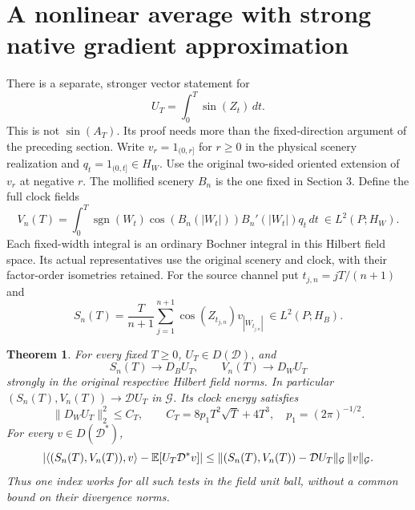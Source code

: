 \documentclass[11pt]{article}
\newtheorem{theorem}{Theorem}[section]
\newcommand{\D}{\mathcal D}\newcommand{\G}{\mathcal G}
\begin{document}
\section{A nonlinear average with strong native gradient approximation}
There is a separate, stronger vector statement for
\[
 U_T=\int_0^T\sin(Z_t)\,dt.
\]
This is not $\sin(A_T)$. Its proof needs more than the fixed-direction
argument of the preceding section. Write $v_r=1_{(0,r]}$ for $r\geq0$
in the physical scenery realization and $q_t=1_{(0,t]}\in H_W$.
Use the original two-sided oriented extension of $v_r$ at negative
$r$. The mollified scenery $B_n$ is the one fixed in Section 3.
Define the full clock fields
\begin{equation}\label{eq:sine-native-clock}
 V_n(T)=\int_0^T\operatorname{sgn}(W_t)
       \cos(B_n(|W_t|))B_n'(|W_t|)q_t\,dt
       \ \in L^2(P;H_W).
\end{equation}
Each fixed-width integral is an ordinary Bochner integral in this
Hilbert field space. Its actual representatives use the original
scenery and clock, with their factor-order isometries retained.
For the source channel put $t_{j,n}=jT/(n+1)$ and
\begin{equation}\label{eq:sine-native-source}
 S_n(T)=\frac{T}{n+1}\sum_{j=1}^{n+1}
       \cos(Z_{t_{j,n}})v_{|W_{t_{j,n}}|}
       \ \in L^2(P;H_B).
\end{equation}

\begin{theorem}\label{thm:sine-strong}
For every fixed $T\geq0$, $U_T\in D(\D)$, and
\[
 S_n(T)\longrightarrow D_BU_T,\qquad
 V_n(T)\longrightarrow D_WU_T
\]
strongly in the original respective Hilbert field norms. In particular
$(S_n(T),V_n(T))\to\D U_T$ in $\G$. Its clock energy satisfies
\begin{equation}\label{eq:sine-energy}
 \|D_WU_T\|_2^2\leq C_T,
 \qquad C_T=8p_1T^2\sqrt T+4T^3,\quad p_1=(2\pi)^{-1/2}.
\end{equation}
For every $v\in D(\D^*)$,
\begin{equation}\label{eq:sine-uniform-test}
 \left|\langle(S_n(T),V_n(T)),v\rangle
       -\E[U_T\D^*v]\right|
 \leq\|(S_n(T),V_n(T))-\D U_T\|_{\G}\,\|v\|_{\G}.
\end{equation}
Thus one index works for all such tests in the field unit ball,
without a common bound on their divergence norms.
\end{theorem}
\end{document}
